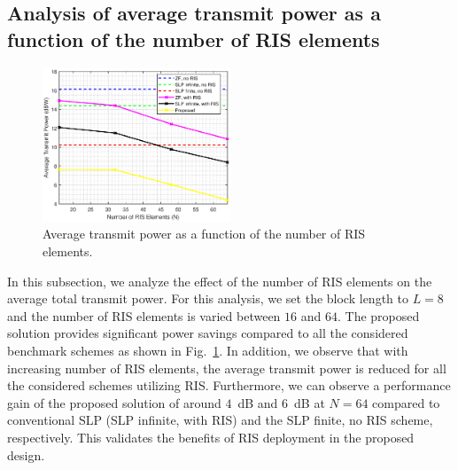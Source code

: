 \documentclass[10pt,conference]{IEEEtran}
\begin{document}
\subsection{Analysis of average transmit power as a function of the number of RIS elements}
\begin{figure}[h!]
	\centering	\includegraphics[width=0.5\textwidth]{Images/risel4.eps}
	\caption{Average transmit power as a function of the number of RIS elements.}
	\label{fig:Con}
\end{figure}
In this subsection, we analyze the effect of the number of RIS elements on the average total transmit power. For this analysis, we set the block length to $L=8$ and the number of RIS elements is varied between $16$ and $64$. The proposed solution provides significant power savings compared to all the considered benchmark schemes as shown in Fig.~\ref{fig:Con}. In addition, we observe that with increasing number of RIS elements, the average transmit power is reduced for all the considered schemes utilizing RIS. Furthermore, we can observe a performance gain of the proposed solution of around $4$~dB and $6$~dB at $N=64$ compared to conventional SLP (SLP infinite, with RIS) and the SLP finite, no RIS scheme, respectively. This validates the benefits of RIS deployment in the proposed design.
\end{document}
